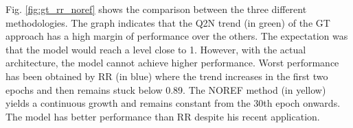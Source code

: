 \documentclass[12pt]{report}
\begin{document}
Fig. \ref{fig:gt_rr_noref} shows the comparison between the three different methodologies. 
The graph indicates that the Q2N trend (in green) of the GT approach has a high margin of performance over the others. The expectation was that the model would reach a level close to 1. However, with the actual architecture, the model cannot achieve higher performance.
Worst performance has been obtained by RR (in blue) where the trend increases in the first two epochs and then remains stuck below 0.89. 
The NOREF method (in yellow) yields a continuous growth and remains constant from the 30th epoch onwards. 
The model has better performance than RR despite his recent application.



\begin{figure}
    \centering
    \hfill
    \\

\end{figure}
\end{document}
